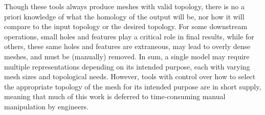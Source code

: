 Though these tools always produce meshes with valid topology, there is no a priori knowledge of what the homology of the output will be, nor how it will compare to the input topology or the desired topology.
For some downstream operations, small holes and features play a critical role in final results, while for others, these same holes and features are extraneous, may lead to overly dense meshes, and must be (manually) removed.
In sum, a single model may require multiple representations depending on its intended purpose, each with varying mesh sizes and topological needs.
However, tools with control over how to select the appropriate topology of the mesh for its intended purpose are in short supply, meaning that much of this work is deferred to time-consuming manual manipulation by engineers.

